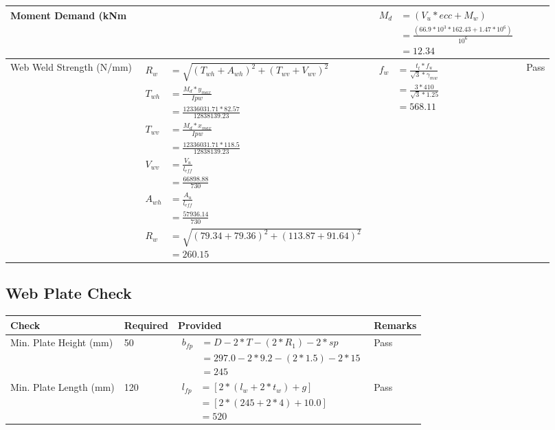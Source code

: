 \documentclass{article}%
\begin{document}
\begin{longtable}{|p{3.5cm}|p{6cm}|p{6cm}|p{1.5cm}|}
\hline%
Moment Demand (kNm&&$\begin{aligned}  M_d &= (V_u * ecc + M_w)\\  &= \frac{(66.9 * 10^3 *162.43 + 1.47*10^6)}{10^6}\\  & =12.34\end{aligned}$&\\%
\hline%
Web Weld Strength (N/mm)&$\begin{aligned} R_w&=\sqrt{(T_{wh}+A_{wh})^2 + (T_{wv}+V_{wv})^2}\\ T_{wh}&=\frac{M_d*y_{max}}{I{pw}}\\ &=\frac{12336031.71*82.57}{12838139.23}\\ T_{wv}&=\frac{M_d* x_{max}}{I{pw}}\\ &=\frac{12336031.71*118.5}{12838139.23}\\ V_{wv}&=\frac{V_u}{l_{eff}}\\  &=\frac{66898.88}{730}\\ A_{wh}&=\frac{A_u}{l_{eff}}\\ &=\frac{57936.14}{730}\\ R_w&=\sqrt{(79.34+79.36)^2 + (113.87+91.64)^2}\\ &=260.15\end{aligned}$&$\begin{aligned} f_w &=\frac{t_t*f_u}{\sqrt{3}*\gamma_{mw}}\\ &=\frac{3*410}{\sqrt{3}*1.25}\\ &=568.11\end{aligned}$&Pass\\%
\hline%
\end{longtable}

%
\newpage%
\subsection{Web Plate Check}%
\label{subsec:WebPlateCheck}%
\renewcommand{\arraystretch}{1.2}%
\begin{longtable}{|p{4cm}|p{4cm}|p{6.5cm}|p{1.5cm}|}%
\hline%
\rowcolor{OsdagGreen}%
Check&Required&Provided&Remarks\\%
\hline%
\endhead%
\hline%
Min. Plate Height (mm)&50&$\begin{aligned} b_{fp} &= {D-2*T -(2 * R_1)- 2*sp} \\ &= {297.0 - 2 * 9.2- (2 *1.5)- 2 *15} \\ &=245\end{aligned}$&Pass\\%
\hline%
Min. Plate Length (mm)&120&$\begin{aligned} l_{fp} & = [2*(l_{w} + 2*t_w) + g]\\ &= [2*(245+2*4) +10.0]\\ &=520\end{aligned}$&Pass\\%
\hline%
\end{longtable}
\end{document}
